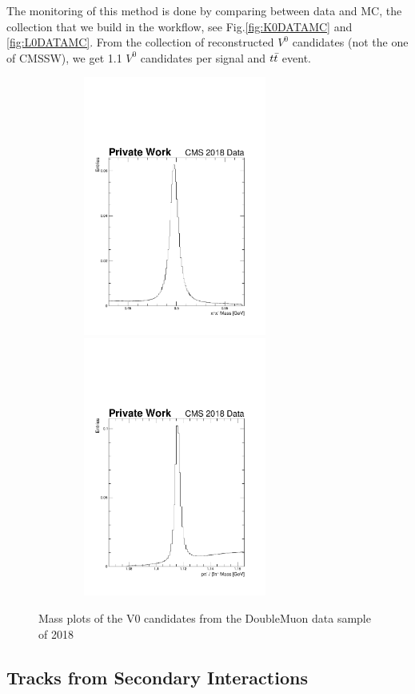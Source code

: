\documentclass{cernatlasnote}
\begin{document}
The monitoring of this method is done by comparing between data and MC, the collection that we build in the workflow, see Fig.\ref{fig:K0DATAMC} and \ref{fig:L0DATAMC}. From the collection of reconstructed $V^0$ candidates (not the one of CMSSW), we get 1.1 $V^0$ candidates per signal and $t\Bar{t}$ event.
   
\begin{figure}[ht]
\hspace{-1.4cm}
\includegraphics[height=8.5cm, width=9cm, trim= 0cm 0cm 0cm 0.cm,clip]{images/V0Candidates/DoubleMuon_UL2018_MiniAODv2_GT36-v1_hData_reco_K0_mass_.pdf}\includegraphics[height=8.5cm, width=9cm, trim= 0cm 0cm 0cm 0.cm,clip]{images/V0Candidates/DoubleMuon_UL2018_MiniAODv2_GT36-v1_hData_reco_L0_mass_.pdf}
\caption{\label{fig:V0Candidates} Mass plots of the V0 candidates from the DoubleMuon data sample of 2018}
\end{figure}

\subsection{Tracks from Secondary Interactions}
\end{document}
